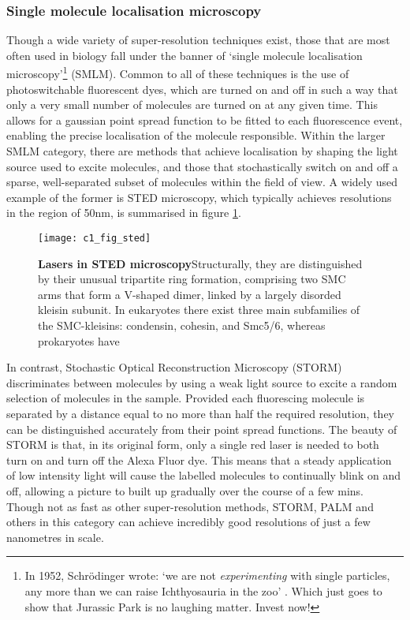 \documentclass[a4paper,11pt,twoside,openright]{scrbook}
\begin{document}
\subsubsection{Single molecule localisation microscopy}
Though a wide variety of super-resolution techniques exist, those that are most often used in biology fall under the banner of `single molecule localisation microscopy'\footnote{In 1952, Schrödinger wrote: `we are not \textit{experimenting} with single particles, any more than we can raise Ichthyosauria in the zoo' \cite{Schrodinger1952}. Which just goes to show that Jurassic Park is no laughing matter. Invest now!} (SMLM). Common to all of these techniques is the use of photoswitchable fluorescent dyes, which are turned on and off in such a way that only a very small number of molecules are turned on at any given time. This allows for a gaussian point spread function to be fitted to each fluorescence event, enabling the precise localisation of the molecule responsible. Within the larger SMLM category, there are methods that achieve localisation by shaping the light source used to excite molecules, and those that stochastically switch on and off a sparse, well-separated subset of molecules within the field of view. A widely used example of the former is STED microscopy, which typically achieves resolutions in the region of 50nm, is summarised in figure \ref{figure:sted}.

\begin{figure}[h]
\fcapsideright
    {\caption[Lasers in STED microscopy]{\sffamily\textbf{Lasers in STED microscopy}\newline \small Structurally, they are distinguished by their unusual tripartite ring formation, comprising two SMC arms that form a V-shaped dimer, linked by a largely disorded kleisin subunit. In eukaryotes there exist three main subfamilies of the SMC-kleisins: condensin, cohesin, and Smc5/6, whereas prokaryotes have }\label{figure:sted}}
    {\texttt{[image: c1\_fig\_sted]}}
\end{figure}

In contrast, Stochastic Optical Reconstruction Microscopy \cite{Rust2006} (STORM) discriminates between molecules by using a weak light source to excite a random selection of molecules in the sample. Provided each fluorescing molecule is separated by a distance equal to no more than half the required resolution, they can be distinguished accurately from their point spread functions. The beauty of STORM is that, in its original form, only a single red laser is needed to both turn on and turn off the Alexa Fluor dye. This means that a steady application of low intensity light will cause the labelled molecules to continually blink on and off, allowing a picture to built up gradually over the course of a few mins. Though not as fast as other super-resolution methods, STORM, PALM and others in this category can achieve incredibly good resolutions of just a few nanometres in scale.
\end{document}
